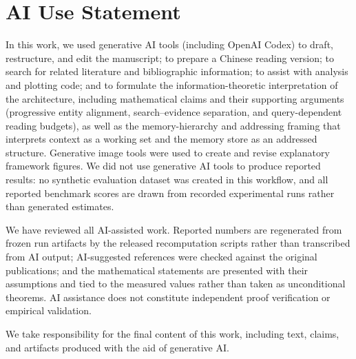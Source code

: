 \section*{AI Use Statement}
\label{sec:ai-assistance}

In this work, we used generative AI tools (including OpenAI Codex) to draft, restructure, and edit the manuscript; to prepare a Chinese reading version; to search for related literature and bibliographic information; to assist with analysis and plotting code; and to formulate the information-theoretic interpretation of the architecture, including mathematical claims and their supporting arguments (progressive entity alignment, search--evidence separation, and query-dependent reading budgets), as well as the memory-hierarchy and addressing framing that interprets context as a working set and the memory store as an addressed structure. Generative image tools were used to create and revise explanatory framework figures. We did not use generative AI tools to produce reported results: no synthetic evaluation dataset was created in this workflow, and all reported benchmark scores are drawn from recorded experimental runs rather than generated estimates.

We have reviewed all AI-assisted work. Reported numbers are regenerated from frozen run artifacts by the released recomputation scripts rather than transcribed from AI output; AI-suggested references were checked against the original publications; and the mathematical statements are presented with their assumptions and tied to the measured values rather than taken as unconditional theorems. AI assistance does not constitute independent proof verification or empirical validation.

We take responsibility for the final content of this work, including text, claims, and artifacts produced with the aid of generative AI.
